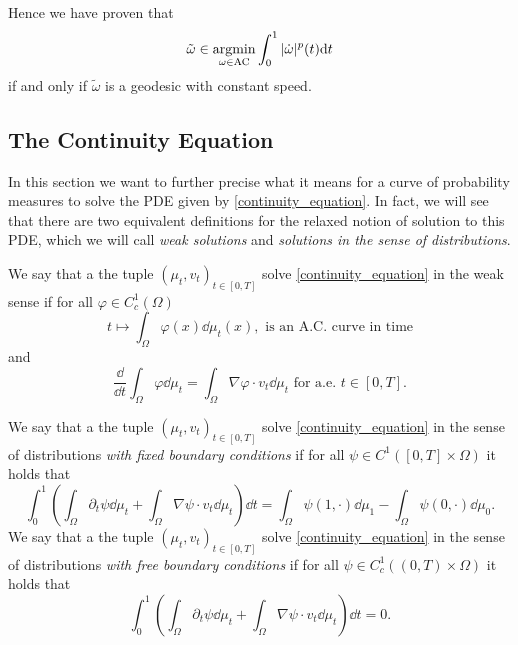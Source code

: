 Hence we have proven that
\begin{equation}
\tilde \omega \in \mathop{\rm argmin}_{\omega \in \text{AC}} \int_0^1|\dot{\omega}|^p(t){\rm d} t
\end{equation}
if and only if $\tilde \omega$ is a geodesic with constant speed. 

\subsection{The Continuity Equation}
In this section we want to further precise what it means for a curve of probability measures to solve the PDE given by \eqref{continuity_equation}. In fact, we will see that there are two equivalent definitions for the relaxed notion of solution to this PDE, which we will call {\em weak solutions} and {\em solutions in the sense of distributions}. 

\begin{definition}
	\label{definition.weak_solution}
	We say that a the tuple $(\mu_t, v_t)_{t \in [0,T]}$ solve \eqref{continuity_equation} in the weak sense if for all $\varphi \in C^1_c(\Omega)$
	\begin{equation}
	t \mapsto \int_{\Omega}\varphi(x)\dd \mu_t(x), \text{ is an A.C. curve in time}
	\end{equation}
	and 
	\begin{equation}
	\frac{\dd}{\dd t} \int_{\Omega}\varphi\dd \mu_t =
	\int_{\Omega}\nabla \varphi\cdot v_t\dd \mu_t \text{ for a.e. $t \in [0,T]$}.
	\end{equation}
\end{definition}

\begin{definition}
	\label{definition.solution_distributions}
	We say that a the tuple $(\mu_t, v_t)_{t \in [0,T]}$ solve \eqref{continuity_equation} in the sense of distributions {\em with fixed boundary conditions} if for all $\psi \in C^1([0,T]\times \Omega)$ it holds that 
	\begin{equation}
	\int_0^1\left(\int_{\Omega}\partial_t\psi \dd\mu_t + \int_{\Omega}\nabla\psi\cdot v_t\dd\mu_t\right)\dd t = \int_{\Omega}\psi(1,\cdot)\dd\mu_1 - \int_{\Omega}\psi(0,\cdot)\dd\mu_0.
	\end{equation}
	We say that a the tuple $(\mu_t, v_t)_{t \in [0,T]}$ solve \eqref{continuity_equation} in the sense of distributions {\em with free boundary conditions} if for all $\psi \in C^1_c((0,T)\times \Omega)$ it holds that 
	\begin{equation}
	\int_0^1\left(\int_{\Omega}\partial_t\psi \dd\mu_t + \int_{\Omega}\nabla\psi\cdot v_t\dd\mu_t\right)\dd t = 0.
	\end{equation}
\end{definition}

